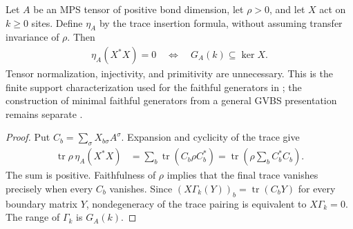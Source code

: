 \begin{lemma}
    \label{thm:faithful_local_mps_support}
    \leanok
    Let $A$ be an MPS tensor of positive bond dimension, let $\rho>0$,
    and let $X$ act on $k\geq0$ sites. Define $\eta_A$ by the trace
    insertion formula, without assuming transfer invariance of $\rho$.
    Then
    \begin{align}
        \eta_A(X^*X)=0
        \quad\Longleftrightarrow\quad
        G_A(k)\subseteq\ker X.
        \label{eq:faithful_local_mps_support}
    \end{align}
    Tensor normalization, injectivity, and primitivity are unnecessary.
    This is the finite support characterization used for the faithful
    generators in \cite[Section~3 and the proof of the overlap lemma in
        Section~4]{Nachtergaele1996Spectral}; the construction of minimal
    faithful generators from a general GVBS presentation remains separate
    \cite{gap:nachtergaele96_infinite_volume_ground_projection}.
\end{lemma}
\begin{proof}\leanok
    Put $C_b=\sum_\sigma X_{b\sigma}A^\sigma$. Expansion and cyclicity of
    the trace give
    \begin{align}
        \operatorname{tr}\rho\,\eta_A(X^*X)
         & =\sum_b\operatorname{tr}(C_b\rho C_b^*)
        =\operatorname{tr}\!\left(\rho\sum_b C_b^*C_b\right).
        \label{eq:faithful_local_square_expansion}
    \end{align}
    The sum is positive. Faithfulness of $\rho$ implies that the final
    trace vanishes precisely when every $C_b$ vanishes. Since
    $(X\Gamma_k(Y))_b=\operatorname{tr}(C_bY)$ for every boundary matrix
    $Y$, nondegeneracy of the trace pairing is equivalent to
    $X\Gamma_k=0$. The range of $\Gamma_k$ is $G_A(k)$.
\end{proof}

